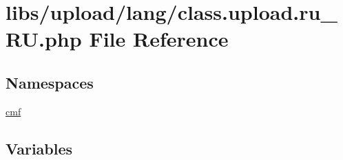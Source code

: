 \hypertarget{class_8upload_8ru___r_u_8php}{}\section{libs/upload/lang/class.upload.\+ru\+\_\+\+R\+U.\+php File Reference}
\label{class_8upload_8ru___r_u_8php}
\subsection*{Namespaces}
\begin{DoxyCompactItemize}
\item 
 \hyperlink{namespacecmf}{cmf}
\end{DoxyCompactItemize}
\subsection*{Variables}
